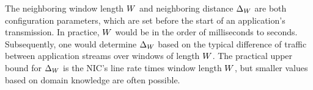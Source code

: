 The neighboring window length $W$ and neighboring distance
$\Delta_{W}$ are both configuration parameters, which are set before the start of an
application's transmission.
In practice, $W$ would be in the order of milliseconds to seconds.
Subsequently, one would determine $\Delta_{W}$ based on the typical
difference of traffic between application streams over windows of length
$W$.
The practical upper bound for $\Delta_{W}$ is the NIC's line rate times
window length $W$, but smaller values based on domain knowledge are
often possible.

